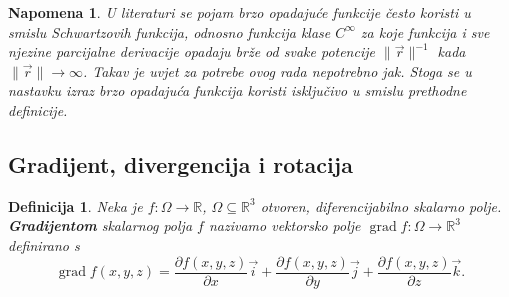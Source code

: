 \documentclass[12pt,a4paper]{article}
\newtheorem{deff}[tm]{Definicija}
\newtheorem{napomena}[tm]{Napomena}
\begin{document}
    
\begin{napomena}
U literaturi se pojam brzo opadajuće funkcije često koristi u smislu
Schwartzovih funkcija, odnosno funkcija klase $C^\infty$ za koje funkcija
i sve njezine parcijalne derivacije opadaju brže od svake potencije
$\|\overrightarrow{r}\|^{-1}$ kada
$\|\overrightarrow{r}\|\to\infty$. Takav je uvjet za potrebe ovog rada nepotrebno jak. Stoga se u nastavku
izraz brzo opadajuća funkcija koristi isključivo u smislu prethodne
definicije.
\end{napomena}

\subsection{Gradijent, divergencija i rotacija}

\begin{deff}
Neka je $f:\Omega\to\mathbb{R}$, $\Omega \subseteq \mathbb{R}^3$ otvoren, diferencijabilno skalarno polje.
\textbf{\textit{Gradijentom}} skalarnog polja $f$ nazivamo vektorsko polje
$\operatorname{grad}f:\Omega\to\mathbb{R}^3$ definirano s
$$
\operatorname{grad}f(x,y,z)
=
\frac{\partial f(x,y,z)}{\partial x}\overrightarrow{i}
+
\frac{\partial f(x,y,z)}{\partial y}\overrightarrow{j}
+
\frac{\partial f(x,y,z)}{\partial z}\overrightarrow{k}.
$$
\end{deff}
\end{document}
